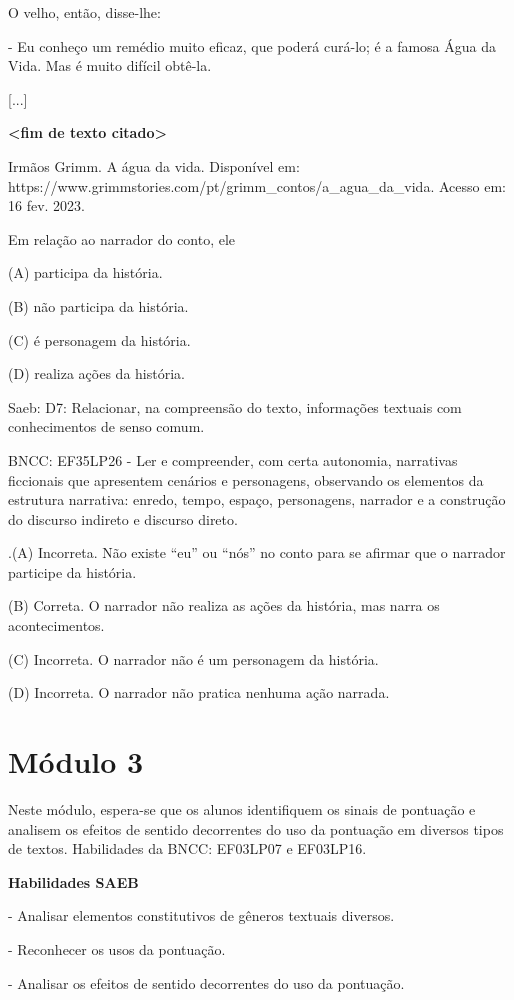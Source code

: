 O velho, então, disse-lhe:

- Eu conheço um remédio muito eficaz, que poderá curá-lo; é a famosa
Água da Vida. Mas é muito difícil obtê-la.

{[}...{]}

\textbf{\textless{}fim de texto citado\textgreater{}}

Irmãos Grimm. A água da vida. Disponível em:
https://www.grimmstories.com/pt/grimm\_contos/a\_agua\_da\_vida. Acesso
em: 16 fev. 2023.

Em relação ao narrador do conto, ele

(A) participa da história.

(B) não participa da história.

(C) é personagem da história.

(D) realiza ações da história.

Saeb: D7: Relacionar, na compreensão do texto, informações textuais com
conhecimentos de senso comum.

BNCC: EF35LP26 - Ler e compreender, com certa autonomia, narrativas
ficcionais que apresentem cenários e personagens, observando os
elementos da estrutura narrativa: enredo, tempo, espaço, personagens,
narrador e a construção do discurso indireto e discurso direto.

.(A) Incorreta. Não existe ``eu'' ou ``nós'' no conto para se afirmar
que o narrador participe da história.

(B) Correta. O narrador não realiza as ações da história, mas narra os
acontecimentos.

(C) Incorreta. O narrador não é um personagem da história.

(D) Incorreta. O narrador não pratica nenhuma ação narrada.

\section{Módulo 3}\label{muxf3dulo-3}

Neste módulo, espera-se que os alunos identifiquem os sinais de
pontuação e analisem os efeitos de sentido decorrentes do uso da
pontuação em diversos tipos de textos. Habilidades da BNCC: EF03LP07 e
EF03LP16.

\textbf{Habilidades SAEB}

- Analisar elementos constitutivos de gêneros textuais diversos.

- Reconhecer os usos da pontuação.

- Analisar os efeitos de sentido decorrentes do uso da pontuação.

